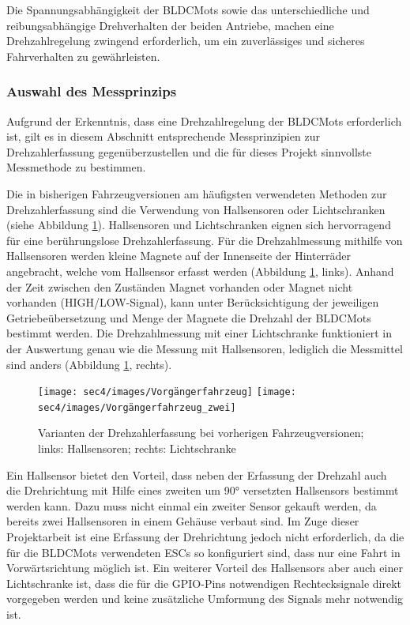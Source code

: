 Die Spannungsabhängigkeit der \acp{BLDCMot} sowie das unterschiedliche und reibungsabhängige Drehverhalten der beiden Antriebe, machen eine Drehzahlregelung zwingend erforderlich, um ein zuverlässiges und sicheres Fahrverhalten zu gewährleisten.

\subsubsection{Auswahl des Messprinzips}\label{Sec4Sub5Sub2}

Aufgrund der Erkenntnis, dass eine Drehzahlregelung der \acp{BLDCMot} erforderlich ist, gilt es in diesem Abschnitt entsprechende Messprinzipien zur Drehzahlerfassung gegenüberzustellen und die für dieses Projekt sinnvollste Messmethode zu bestimmen.\vspace{11pt}

Die in bisherigen Fahrzeugversionen am häufigsten verwendeten Methoden zur Drehzahlerfassung sind die Verwendung von Hallsensoren oder Lichtschranken (siehe Abbildung \ref{fig:Vorgaengerfahrzeug}). Hallsensoren und Lichtschranken eignen sich hervorragend für eine berührungslose Drehzahlerfassung. Für die Drehzahlmessung mithilfe von Hallsensoren werden kleine Magnete auf der Innenseite der Hinterräder angebracht, welche vom Hallsensor erfasst werden (Abbildung \ref{fig:Vorgaengerfahrzeug}, links). Anhand der Zeit zwischen den Zuständen \glqq{}Magnet vorhanden\grqq{} oder \glqq{}Magnet nicht vorhanden\grqq{} (HIGH/LOW-Signal), kann unter Berücksichtigung der jeweiligen Getriebeübersetzung und Menge der Magnete die Drehzahl der \acp{BLDCMot} bestimmt werden. Die Drehzahlmessung mit einer Lichtschranke funktioniert in der Auswertung genau wie die Messung mit  Hallsensoren, lediglich die Messmittel sind anders (Abbildung \ref{fig:Vorgaengerfahrzeug}, rechts).

\begin{figure}[H] %
\texttt{[image: sec4/images/Vorgängerfahrzeug]} 
\texttt{[image: sec4/images/Vorgängerfahrzeug\_zwei]} 
\captionsetup{width=.95\textwidth}
\centering
\caption[Varianten der Drehzahlerfassung bei vorherigen Fahrzeugversionen]{Varianten der Drehzahlerfassung bei vorherigen Fahrzeugversionen; links: Hallsensoren; rechts: Lichtschranke}\centering
\label{fig:Vorgaengerfahrzeug}
\end{figure}     


Ein Hallsensor bietet den Vorteil, dass neben der Erfassung der Drehzahl auch die Drehrichtung mit Hilfe eines zweiten um 90° versetzten Hallsensors bestimmt werden kann. Dazu muss nicht einmal ein zweiter Sensor gekauft werden, da bereits zwei Hallsensoren in einem Gehäuse verbaut sind. Im Zuge dieser Projektarbeit ist eine Erfassung der Drehrichtung jedoch nicht erforderlich, da die für die \acp{BLDCMot} verwendeten \acp{ESC} so konfiguriert sind, dass nur eine Fahrt in Vorwärtsrichtung möglich ist. Ein weiterer Vorteil des Hallsensors aber auch einer Lichtschranke ist, dass die für die GPIO-Pins notwendigen Rechtecksignale direkt vorgegeben werden und keine zusätzliche Umformung des Signals mehr notwendig ist. \vspace{11pt}

